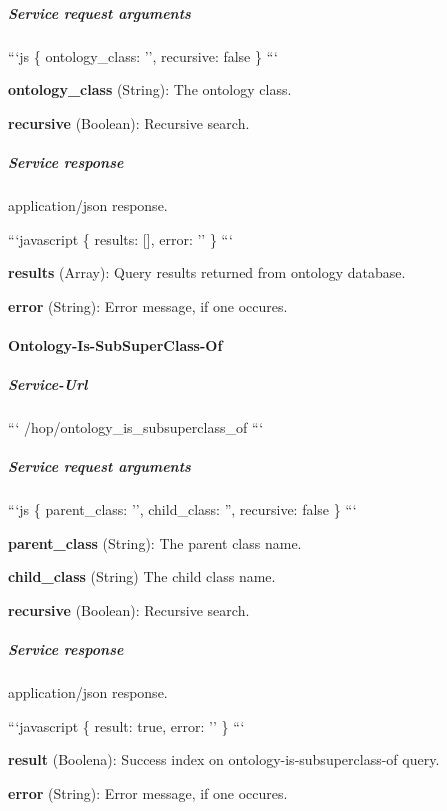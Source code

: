 \subparagraph*{Service request arguments}

```js \{ ontology\-\_\-class\-: '', recursive\-: false \} ```


\begin{DoxyItemize}
\item {\bfseries ontology\-\_\-class} (String)\-: The ontology class.
\item {\bfseries recursive} (Boolean)\-: Recursive search.
\end{DoxyItemize}

\subparagraph*{Service response}

application/json response.

```javascript \{ results\-: \mbox{[}\mbox{]}, error\-: '' \} ```


\begin{DoxyItemize}
\item {\bfseries results} (Array)\-: Query results returned from ontology database.
\item {\bfseries error} (String)\-: Error message, if one occures.
\end{DoxyItemize}

\paragraph*{Ontology-\/\-Is-\/\-Sub\-Super\-Class-\/\-Of}

\subparagraph*{Service-\/\-Url}

``` /hop/ontology\-\_\-is\-\_\-subsuperclass\-\_\-of ```

\subparagraph*{Service request arguments}

```js \{ parent\-\_\-class\-: '', child\-\_\-class\-: '', recursive\-: false \} ```


\begin{DoxyItemize}
\item {\bfseries parent\-\_\-class} (String)\-: The parent class name.
\item {\bfseries child\-\_\-class} (String) The child class name.
\item {\bfseries recursive} (Boolean)\-: Recursive search.
\end{DoxyItemize}

\subparagraph*{Service response}

application/json response.

```javascript \{ result\-: true, error\-: '' \} ```


\begin{DoxyItemize}
\item {\bfseries result} (Boolena)\-: Success index on ontology-\/is-\/subsuperclass-\/of query.
\item {\bfseries error} (String)\-: Error message, if one occures.
\end{DoxyItemize}



